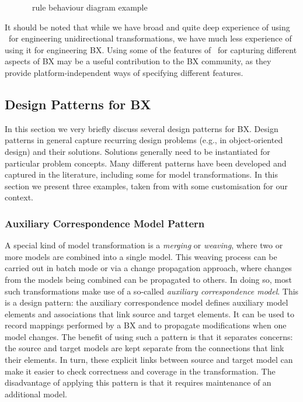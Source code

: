  \begin{figure}[htbp]
\caption{\transml\ rule behaviour diagram example}
\label{fig:transml-rule-behaviour-example}
\end{figure}

It should be noted that while we have broad and quite deep experience of using \transml\ for engineering unidirectional transformations, we have much less experience of using it for engineering BX. Using some of the features of \transml\ for capturing different aspects of BX may be a useful contribution to the BX community, as they provide platform-independent ways of specifying different features.

\subsection{Design Patterns for BX}
In this section we very briefly discuss several design patterns \cite{Gof1995} for BX. Design patterns in general capture recurring design problems (e.g., in object-oriented design) and their solutions. Solutions generally need to be instantiated for particular problem concepts. Many different patterns have been developed and captured in the literature, including some for model transformations. In this section we present three examples, taken from \cite{LanoKR14} with some customisation for our context.

\subsubsection{Auxiliary Correspondence Model Pattern}
A special kind of model transformation is a \textit{merging} or \textit{weaving}, where two or more models are combined into a single model. This weaving process can be carried out in batch mode or via a change propagation approach, where changes from the models being combined can be propagated to others. In doing so, most such transformations make use of a so-called \textit{auxiliary correspondence model}. This is a design pattern: the auxiliary correspondence model defines auxiliary model elements and associations that link source and target elements. It can be used to record mappings performed by a BX and to propagate modifications when one model changes. The benefit of using such a pattern is that it separates concerns: the source and target models are kept separate from the connections that link their elements. In turn, these explicit links between source and target model can make it easier to check correctness and coverage in the transformation. The disadvantage of applying this pattern is that it requires maintenance of an additional model.

